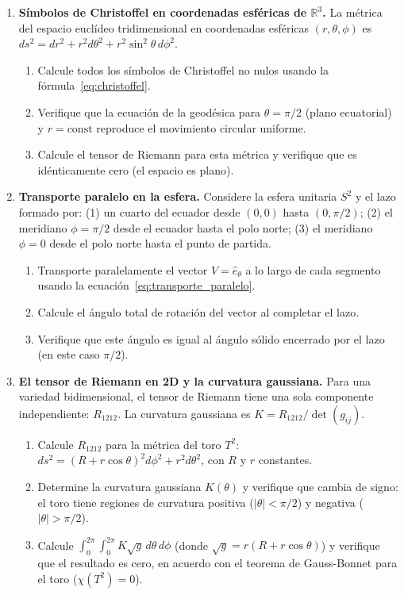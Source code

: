\begin{enumerate}[leftmargin=2em, label=\textbf{P\thechapter.\arabic*.}]

  \item \textbf{Símbolos de Christoffel en coordenadas esféricas de $\mathbb{R}^3$.}
  La métrica del espacio euclídeo tridimensional en coordenadas esféricas $(r,\theta,\phi)$ es $ds^2 = dr^2 + r^2 d\theta^2 + r^2\sin^2\theta\, d\phi^2$.
  \begin{enumerate}[label=(\alph*)]
    \item Calcule todos los símbolos de Christoffel no nulos usando la fórmula~\eqref{eq:christoffel}.
    \item Verifique que la ecuación de la geodésica para $\theta = \pi/2$ (plano ecuatorial) y $r = \text{const}$ reproduce el movimiento circular uniforme.
    \item Calcule el tensor de Riemann para esta métrica y verifique que es idénticamente cero (el espacio es plano).
  \end{enumerate}

  \item \textbf{Transporte paralelo en la esfera.}
  Considere la esfera unitaria $S^2$ y el lazo formado por: (1) un cuarto del ecuador desde $(0,0)$ hasta $(0,\pi/2)$; (2) el meridiano $\phi=\pi/2$ desde el ecuador hasta el polo norte; (3) el meridiano $\phi=0$ desde el polo norte hasta el punto de partida.
  \begin{enumerate}[label=(\alph*)]
    \item Transporte paralelamente el vector $V = \hat{e}_\theta$ a lo largo de cada segmento usando la ecuación~\eqref{eq:transporte_paralelo}.
    \item Calcule el ángulo total de rotación del vector al completar el lazo.
    \item Verifique que este ángulo es igual al ángulo sólido encerrado por el lazo (en este caso $\pi/2$).
  \end{enumerate}

  \item \textbf{El tensor de Riemann en 2D y la curvatura gaussiana.}
  Para una variedad bidimensional, el tensor de Riemann tiene una sola componente independiente: $R_{1212}$. La curvatura gaussiana es $K = R_{1212}/\det(g_{ij})$.
  \begin{enumerate}[label=(\alph*)]
    \item Calcule $R_{1212}$ para la métrica del toro $T^2$: $ds^2 = (R + r\cos\theta)^2 d\phi^2 + r^2 d\theta^2$, con $R$ y $r$ constantes.
    \item Determine la curvatura gaussiana $K(\theta)$ y verifique que cambia de signo: el toro tiene regiones de curvatura positiva ($|\theta| < \pi/2$) y negativa ($|\theta| > \pi/2$).
    \item Calcule $\int_0^{2\pi}\int_0^{2\pi} K\sqrt{g}\, d\theta\, d\phi$ (donde $\sqrt{g} = r(R+r\cos\theta)$) y verifique que el resultado es cero, en acuerdo con el teorema de Gauss-Bonnet para el toro ($\chi(T^2) = 0$).
  \end{enumerate}


\end{enumerate}
